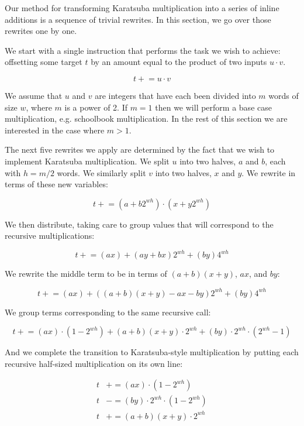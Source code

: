 \documentclass[onecolumn,unpublished]{quantumarticle}
\begin{document}
\newcommand{\pluseq}{\mathrel{+}=}
\newcommand{\minuseq}{\mathrel{-}=}
\newcommand{\timeseq}{\mathrel{\ast}=}

Our method for transforming Karatsuba multiplication into a series of inline additions is a sequence of trivial rewrites.
In this section, we go over those rewrites one by one.

We start with a single instruction that performs the task we wish to achieve: offsetting some target $t$ by an amount equal to the product of two inputs $u \cdot v$.

$$t \pluseq u \cdot v$$

We assume that $u$ and $v$ are integers that have each been divided into $m$ words of size $w$, where $m$ is a power of 2.
If $m=1$ then we will perform a base case multiplication, e.g. schoolbook multiplication.
In the rest of this section we are interested in the case where $m>1$.

The next five rewrites we apply are determined by the fact that we wish to implement Karatsuba multiplication.
We split $u$ into two halves, $a$ and $b$, each with $h=m/2$ words.
We similarly split $v$ into two halves, $x$ and $y$.
We rewrite in terms of these new variables:

$$t \pluseq (a + b 2^{wh}) \cdot (x + y 2^{wh})$$

We then distribute, taking care to group values that will correspond to the recursive multiplications:

$$t \pluseq (ax) + (ay + bx) 2^{wh} + (by)4^{wh}$$

We rewrite the middle term to be in terms of $(a+b)(x + y)$, $ax$, and $by$:

$$t \pluseq (ax) + ((a+b)(x + y) - ax - by) 2^{wh} + (by)4^{wh}$$

We group terms corresponding to the same recursive call:

$$t \pluseq (ax) \cdot (1 - 2^{wh}) + (a+b)(x + y) \cdot 2^{wh} + (by) \cdot 2^{wh} \cdot (2^{wh}-1)$$

And we complete the transition to Karatsuba-style multiplication by putting each recursive half-sized multiplication on its own line:

$$\begin{aligned}
t &\pluseq (ax) \cdot (1 - 2^{wh})
\\
t &\minuseq (by) \cdot 2^{wh} \cdot (1-2^{wh})
\\
t &\pluseq (a+b)(x + y) \cdot 2^{wh}
\end{aligned}$$
\end{document}
